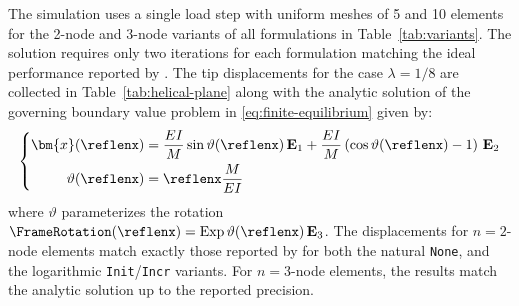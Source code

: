 The simulation uses a single load step with uniform meshes of 5 and 10 \ExactFrame{} elements for the  2-node and 3-node
variants of all formulations in Table~\ref{tab:variants}. 
%
The solution requires only two iterations for each formulation matching the ideal performance reported by \cite{simo1986threedimensional}.
The tip displacements for the case \(\lambda = 1/8\) are collected in Table~\ref{tab:helical-plane} along with
the analytic solution of the governing boundary value problem in \eqref{eq:finite-equilibrium} given by:
\begin{equation*}
  \left\{
  \begin{aligned}
  \bm{x}(\reflenx)&=\frac{EI}{M} \sin \vartheta(\reflenx) \, \mathbf{E}_1
                      + \frac{EI}{M}\left(\cos \vartheta(\reflenx)-1\right) \, \mathbf{E}_2 \\
    \vartheta(\reflenx)   &=  \reflenx \frac{M}{EI}
  \end{aligned}
  \right.
\end{equation*}
%
where \(\vartheta\) parameterizes the rotation \(\FrameRotation(\reflenx) = \operatorname{Exp} \vartheta(\reflenx) \, \mathbf{E}_3\). 
The displacements for \(n=2\)-node elements match exactly those reported by \cite{ibrahimbegović1995computational} for both the natural \texttt{None}, and the logarithmic \texttt{Init}/\texttt{Incr} variants.
For \(n=3\)-node elements, the results match the analytic solution up to the reported precision.
%
%
\begin{center}
\begin{table}[H]
\caption{Tip displacements for the helical cantilever beam under $\lambda = 1/8$ for a discretization with 10 \(n\)-node elements.}
\label{tab:helical-plane}

\end{table}
\end{center}
%
%
